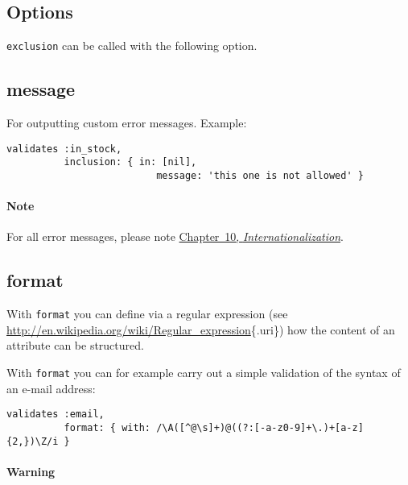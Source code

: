 \documentclass[a4paper]{book}
\begin{document}
\subsection{Options}\label{options-7}

\texttt{exclusion} can be called with the following option.

\subsection{message}\label{message-1}

For outputting custom error messages. Example:

\begin{shaded}\begin{verbatim}
validates :in_stock,
          inclusion: { in: [nil],
                          message: 'this one is not allowed' }
\end{verbatim}\end{shaded}

\paragraph{Note}\label{note-30}

For all error messages, please note \hyperref[i18n]{Chapter~10, \emph{Internationalization}}.

\subsection{format}\label{format}

With \texttt{format} you can define via a regular expression (see \url{http://en.wikipedia.org/wiki/Regular_expression}\{.uri\}) how the content of an attribute can be structured.

With \texttt{format} you can for example carry out a simple validation of the syntax of an e-mail address:

\begin{shaded}\begin{verbatim}
validates :email,
          format: { with: /\A([^@\s]+)@((?:[-a-z0-9]+\.)+[a-z]{2,})\Z/i }
\end{verbatim}\end{shaded}

\paragraph{Warning}\label{warning-8}
\end{document}
